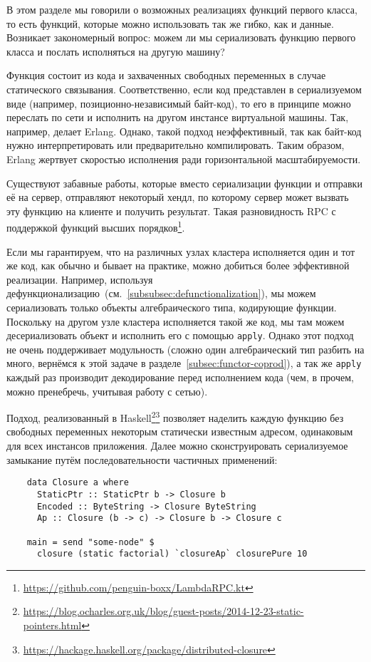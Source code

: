 В этом разделе мы говорили о возможных реализациях функций первого класса, то есть функций, которые можно использовать так же гибко, как и данные.
Возникает закономерный вопрос: можем ли мы сериализовать функцию первого класса и послать исполняться на другую машину?

Функция состоит из кода и захваченных свободных переменных в случае статического связывания.
Соответственно, если код представлен в сериализуемом виде (например, позиционно-независимый байт-код), то его в принципе можно переслать по сети и исполнить на другом инстансе виртуальной машины.
Так, например, делает Erlang.
Однако, такой подход неэффективный, так как байт-код нужно интерпретировать или предварительно компилировать.
Таким образом, Erlang жертвует скоростью исполнения ради горизонтальной масштабируемости.

Существуют забавные работы, которые вместо сериализации функции и отправки её на сервер, отправляют некоторый хендл, по которому сервер может вызвать эту функцию на клиенте и получить результат.
Такая разновидность RPC с поддержкой функций высших порядков\footnote{\url{https://github.com/penguin-boxx/LambdaRPC.kt}}.

Если мы гарантируем, что на различных узлах кластера исполняется один и тот же код, как обычно и бывает на практике, можно добиться более эффективной реализации.
Например, используя дефункционализацию~(см.~\ref{subsubsec:defunctionalization}), мы можем сериализовать только объекты алгебраического типа, кодирующие функции.
Поскольку на другом узле кластера исполняется такой же код, мы там можем десериализовать объект и исполнить его с помощью \texttt{apply}.
Однако этот подход не очень поддерживает модульность (сложно один алгебраический тип разбить на много, вернёмся к этой задаче в разделе~\ref{subsec:functor-coprod}), а так же \texttt{apply} каждый раз производит декодирование перед исполнением кода (чем, в прочем, можно пренебречь, учитывая работу с сетью).

Подход, реализованный в Haskell\footnote{\url{https://blog.ocharles.org.uk/blog/guest-posts/2014-12-23-static-pointers.html}}\footnote{\url{https://hackage.haskell.org/package/distributed-closure}} позволяет наделить каждую функцию без свободных переменных некоторым статически известным адресом, одинаковым для всех инстансов приложения.
Далее можно сконструировать сериализуемое замыкание путём последовательности частичных применений:
\begin{verbatim}
    data Closure a where
      StaticPtr :: StaticPtr b -> Closure b
      Encoded :: ByteString -> Closure ByteString
      Ap :: Closure (b -> c) -> Closure b -> Closure c

    main = send "some-node" $
      closure (static factorial) `closureAp` closurePure 10
\end{verbatim}

